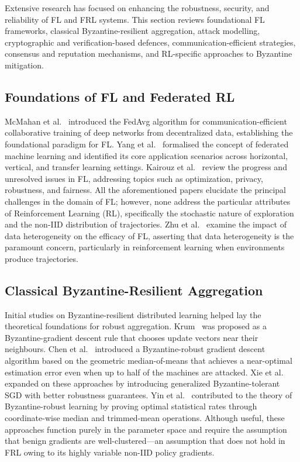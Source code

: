 \documentclass[12pt,a4paper]{article}
\begin{document}
Extensive research has focused on enhancing the robustness, security, and reliability
of FL and FRL systems. This section reviews foundational FL frameworks, classical
Byzantine-resilient aggregation, attack modelling, cryptographic and
verification-based defences, communication-efficient strategies, consensus and
reputation mechanisms, and RL-specific approaches to Byzantine mitigation.

\subsection{Foundations of FL and Federated RL}

McMahan et al.~\cite{ref25} introduced the FedAvg algorithm for
communication-efficient collaborative training of deep networks from decentralized
data, establishing the foundational paradigm for FL. Yang et al.~\cite{ref24}
formalised the concept of federated machine learning and identified its core
application scenarios across horizontal, vertical, and transfer learning settings.
Kairouz et al.~\cite{ref2} review the progress and unresolved issues in FL, addressing
topics such as optimization, privacy, robustness, and fairness. All the aforementioned
papers elucidate the principal challenges in the domain of FL; however, none address
the particular attributes of Reinforcement Learning (RL), specifically the stochastic
nature of exploration and the non-IID distribution of trajectories. Zhu et
al.~\cite{ref3} examine the impact of data heterogeneity on the efficacy of FL,
asserting that data heterogeneity is the paramount concern, particularly in
reinforcement learning when environments produce trajectories.

\subsection{Classical Byzantine-Resilient Aggregation}

Initial studies on Byzantine-resilient distributed learning helped lay the theoretical
foundations for robust aggregation. Krum~\cite{ref19} was proposed as a
Byzantine-gradient descent rule that chooses update vectors near their neighbours.
Chen et al.~\cite{ref20} introduced a Byzantine-robust gradient descent algorithm
based on the geometric median-of-means that achieves a near-optimal estimation error
even when up to half of the machines are attacked. Xie et al.~\cite{ref21} expanded on
these approaches by introducing generalized Byzantine-tolerant SGD with better
robustness guarantees. Yin et al.~\cite{ref22} contributed to the theory of
Byzantine-robust learning by proving optimal statistical rates through coordinate-wise
median and trimmed-mean operations. Although useful, these approaches function purely
in the parameter space and require the assumption that benign gradients are
well-clustered---an assumption that does not hold in FRL owing to its highly variable
non-IID policy gradients.
\end{document}
